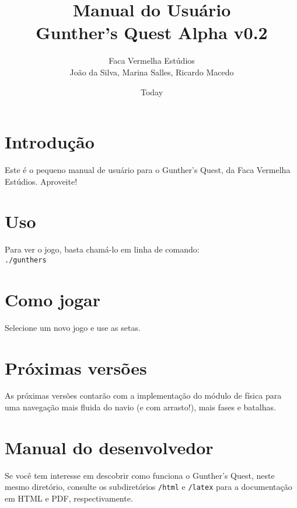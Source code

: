 \documentclass[]{paper}
\begin{document}
\title{Manual do Usuário \\ Gunther's Quest Alpha v0.2}
\author{Faca Vermelha Estúdios\\João da Silva, Marina Salles, Ricardo Macedo}
\date{Today}
\maketitle

\section{Introdução}
Este é o pequeno manual de usuário para o Gunther's Quest, da Faca Vermelha Estúdios. Aproveite!
\section{Uso}
Para ver o jogo, basta chamá-lo em linha de comando:
\\

\texttt{./gunthers}

\section{Como jogar}
Selecione um novo jogo e use as setas.

\section{Próximas versões}
As próximas versões contarão com a implementação do módulo de física para uma navegação mais fluida do navio (e com arrasto!), mais fases e batalhas.

\section{Manual do desenvolvedor}
Se você tem interesse em descobrir como funciona o Gunther's Quest, neste mesmo diretório, consulte os subdiretórios \texttt{/html} e \texttt{/latex} para a documentação em HTML e PDF, respectivamente.
\end{document}
